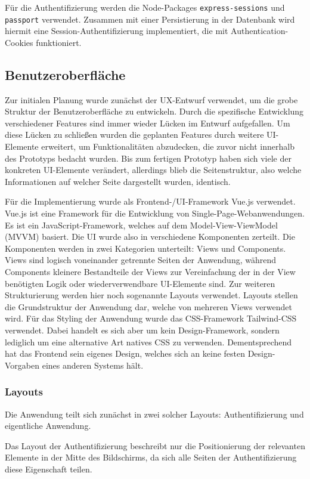 Für die Authentifizierung werden die Node-Packages \verb|express-sessions| und \verb|passport| verwendet. Zusammen mit einer Persistierung in der Datenbank wird hiermit eine Session-Authentifizierung implementiert, die mit Authentication-Cookies funktioniert.

\subsection{Benutzeroberfläche}
Zur initialen Planung wurde zunächst der UX-Entwurf verwendet, um die grobe Struktur der Benutzeroberfläche zu entwickeln. Durch die spezifische Entwicklung verschiedener Features sind immer wieder Lücken im Entwurf aufgefallen. Um diese Lücken zu schließen wurden die geplanten Features durch weitere UI-Elemente erweitert, um Funktionalitäten abzudecken, die zuvor nicht innerhalb des Prototyps bedacht wurden. Bis zum fertigen Prototyp haben sich viele der konkreten UI-Elemente verändert, allerdings blieb die Seitenstruktur, also welche Informationen auf welcher Seite dargestellt wurden, identisch.

Für die Implementierung wurde als Frontend-/UI-Framework Vue.js verwendet. Vue.js ist eine Framework für die Entwicklung von Single-Page-Webanwendungen. Es ist ein JavaScript-Framework, welches auf dem Model-View-ViewModel (MVVM) basiert. Die UI wurde also in verschiedene Komponenten zerteilt. Die Komponenten werden in zwei Kategorien unterteilt: Views und Components. Views sind logisch voneinander getrennte Seiten der Anwendung, während Components kleinere Bestandteile der Views zur Vereinfachung der in der View benötigten Logik oder wiederverwendbare UI-Elemente sind. Zur weiteren Strukturierung werden hier noch sogenannte Layouts verwendet. Layouts stellen die Grundstruktur der Anwendung dar, welche von mehreren Views verwendet wird. Für das Styling der Anwendung wurde das CSS-Framework Tailwind-CSS verwendet. Dabei handelt es sich aber um kein Design-Framework, sondern lediglich um eine alternative Art natives CSS zu verwenden. Dementsprechend hat das Frontend sein eigenes Design, welches sich an keine festen Design-Vorgaben eines anderen Systems hält.

\subsubsection{Layouts}
Die Anwendung teilt sich zunächst in zwei solcher Layouts: Authentifizierung und eigentliche Anwendung.

Das Layout der Authentifizierung beschreibt nur die Positionierung der relevanten Elemente in der Mitte des Bildschirms, da sich alle Seiten der Authentifizierung diese Eigenschaft teilen.

